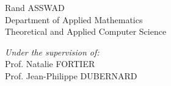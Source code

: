 \begin{titlepage}
\begin{sffamily}
\begin{center}
            \begin{minipage}{0.45\textwidth}
            \begin{flushleft} \large
                Rand ASSWAD\\
                Department of Applied Mathematics\\
                Theoretical and Applied Computer Science
            \end{flushleft}
            \end{minipage}
            \begin{minipage}{0.45\textwidth}
            \begin{flushright} \large
                \emph{Under the supervision of:}\\
                Prof. Natalie FORTIER\\
                Prof. Jean-Philippe DUBERNARD
            \end{flushright}
            \end{minipage}

            \vfill
            {\large \@date}
        \end{center}
    \end{sffamily}
\end{titlepage}
\makeatother
